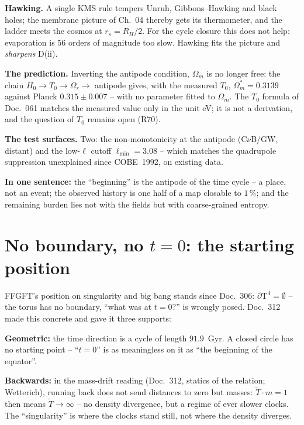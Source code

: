 \textbf{Hawking.} A single KMS rule tempers Unruh,
Gibbons--Hawking and black holes; the membrane picture of Ch.~04
thereby gets its thermometer, and the ladder meets the cosmos at
$r_s = R_H/2$. For the cycle closure this does not help:
evaporation is $56$ orders of magnitude too slow. Hawking fits the
picture and \emph{sharpens} D(ii).

\textbf{The prediction.} Inverting the antipode condition,
$\Omega_m$ is no longer free: the chain
$H_0 \to T_0 \to \Omega_r \to$ antipode gives, with the measured
$T_0$, $\Omega_m^{*} = 0.3139$ against Planck $0.315\pm0.007$ --
with no parameter fitted to $\Omega_m$. The $T_0$ formula of
Doc.~061 matches the measured value only in the unit eV; it is not
a derivation, and the question of $T_0$ remains open (R70).

\textbf{The test surfaces.} Two: the non-monotonicity at the
antipode (C$\nu$B/GW, distant) and the low-$\ell$ cutoff
$\ell_\text{min} = 3.08$ -- which matches the quadrupole
suppression unexplained since COBE~1992, on existing data.

\medskip
\noindent\textbf{In one sentence:} the \enquote{beginning} is the
antipode of the time cycle -- a place, not an event; the observed
history is one half of a map closable to $1\,\%$; and the
remaining burden lies not with the fields but with coarse-grained
entropy.

\chapter{No boundary, no $t=0$: the starting position}

FFGFT's position on singularity and big bang stands since
Doc.~306: $\partial\text{T}^4 = \emptyset$ -- the torus has no
boundary, \enquote{what was at $t=0$?} is wrongly posed. Doc.~312
made this concrete and gave it three supports:

\textbf{Geometric:} the time direction is a cycle of length
$91.9$~Gyr. A closed circle has no starting point --
\enquote{$t=0$} is as meaningless on it as \enquote{the beginning
of the equator}.

\textbf{Backwards:} in the mass-drift reading (Doc.~312, statics
of the relation; Wetterich), running back does not send distances
to zero but masses: $\tilde T \cdot m = 1$ then means
$\tilde T \to \infty$ -- no density divergence, but a regime of
ever slower clocks. The \enquote{singularity} is where the clocks
stand still, not where the density diverges.

